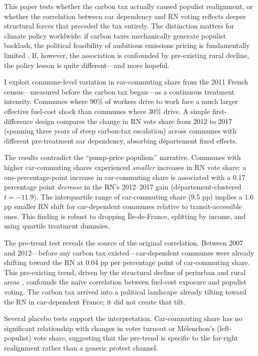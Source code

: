 \documentclass[12pt]{article}
\begin{document}
This paper tests whether the carbon tax actually caused populist realignment, or whether the correlation between car dependency and RN voting reflects deeper structural forces that preceded the tax entirely. The distinction matters for climate policy worldwide: if carbon taxes mechanically generate populist backlash, the political feasibility of ambitious emissions pricing is fundamentally limited \citep{klenert2018making, carattini2018green}. If, however, the association is confounded by pre-existing rural decline, the policy lesson is quite different---and more hopeful.

I exploit commune-level variation in car-commuting share from the 2011 French census---measured before the carbon tax began---as a continuous treatment intensity. Communes where 90\% of workers drive to work face a much larger effective fuel-cost shock than communes where 30\% drive. A simple first-difference design compares the change in RN vote share from 2012 to 2017 (spanning three years of steep carbon-tax escalation) across communes with different pre-treatment car dependency, absorbing d\'{e}partement fixed effects.

The results contradict the ``pump-price populism'' narrative. Communes with higher car-commuting shares experienced \textit{smaller} increases in RN vote share: a one-percentage-point increase in car-commuting share is associated with a 0.17 percentage point \textit{decrease} in the RN's 2012--2017 gain (d\'{e}partement-clustered $t = -11.9$). The interquartile range of car-commuting share (9.5 pp) implies a 1.6 pp smaller RN shift for car-dependent communes relative to transit-accessible ones. This finding is robust to dropping \^{I}le-de-France, splitting by income, and using quartile treatment dummies.

The pre-trend test reveals the source of the original correlation. Between 2007 and 2012---before any carbon tax existed---car-dependent communes were already shifting toward the RN at 0.04 pp per percentage point of car-commuting share. This pre-existing trend, driven by the structural decline of periurban and rural areas \citep{guilluy2014france}, confounds the na\"{i}ve correlation between fuel-cost exposure and populist voting. The carbon tax arrived into a political landscape already tilting toward the RN in car-dependent France; it did not create that tilt.

Several placebo tests support the interpretation. Car-commuting share has no significant relationship with changes in voter turnout or M\'{e}lenchon's (left-populist) vote share, suggesting that the pre-trend is specific to the far-right realignment rather than a generic protest channel.
\end{document}
